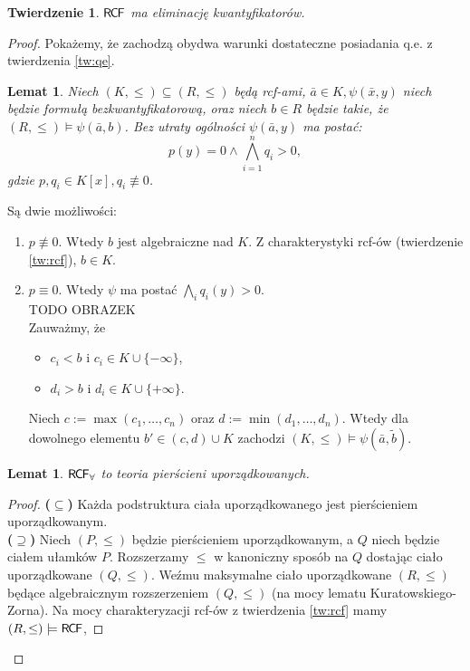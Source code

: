 \documentclass{article}
\theoremstyle{plain}
\newtheorem{tw}[thm]{Twierdzenie}
\newtheorem{lem}[thm]{Lemat}
\theoremstyle{definition}
\theoremstyle{remark}
\newcommand{\RCF}{\mathsf{R \mkern-1.7mu C \mkern-1.4mu F}}
\begin{document}
\begin{tw}
	 $ \RCF$ ma eliminację kwantyfikatorów.
\end{tw}
\begin{proof}
	Pokażemy, że zachodzą obydwa warunki dostateczne posiadania q.e. z twierdzenia \ref{tw:qe}.
	\begin{lem} %
		 Niech $ (K, \leq) \subseteq (R, \leq)$ będą rcf-ami,
	        $ \bar{a} \in K, \psi(\bar{x}, y)$ niech będzie formułą bezkwantyfikatorową,
		oraz niech $ b \in R$ będzie takie, że $(R, \leq) \models  \psi(\bar{a}, b)$.
		Bez utraty ogólności $ \psi(\bar{a}, y)$ ma postać:
		\[
			p(y) = 0 \wedge  \bigwedge_{ i = 1 }^n q_i > 0,
		\]
		gdzie $ p, q_i \in K[x], q_i \not \equiv 0$.
	\end{lem}
	Są dwie możliwości:
	\begin{enumerate}
		\item $ p \not \equiv 0$.
			Wtedy $ b$ jest algebraiczne nad $ K$.
			Z charakterystyki rcf-ów (twierdzenie \ref{tw:rcf}), $ b \in K$.
		\item $ p \equiv 0$.
			Wtedy $ \psi$ ma postać $ \bigwedge_{ i } q_i(y) > 0$.
			\\TODO OBRAZEK\\
			Zauważmy, że
			\begin{itemize}
				\item $ c_i < b$ i $ c_i \in K \cup \{-\infty\}$,
				\item $ d_i > b$ i $ d_i \in K \cup \{+\infty\}$.
			\end{itemize}
			Niech $ c := \max (c_1, \ldots, c_n)$ oraz $ d := \min (d_1, \ldots, d_n)$.
			Wtedy dla dowolnego elementu $ b' \in (c,d) \cup K $ zachodzi $ (K, \leq) \models \psi(\bar{a},\tilde{b})$.
	\end{enumerate}
	\begin{lem}
		 $\RCF_{\forall}$ to teoria pierścieni uporządkowanych.
	\end{lem}
	\begin{proof}
		 \textbf{($ \subseteq$)} Każda podstruktura ciała uporządkowanego jest pierścieniem uporządkowanym.
		 \\\textbf{($ \supseteq$)} Niech $ (P, \leq)$ będzie pierścieniem uporządkowanym, a $Q$ niech będzie ciałem ułamków $P$.
		 Rozszerzamy $\leq$ w kanoniczny sposób na $Q$ dostając ciało uporządkowane $ (Q, \leq)$.
		 Weźmu maksymalne ciało uporządkowane $(R, \leq)$ będące algebraicznym rozszerzeniem $ (Q, \leq)$
		 (na mocy lematu Kuratowskiego-Zorna).
		 Na mocy charakteryzacji rcf-ów z twierdzenia \ref{tw:rcf} mamy $(R, \leq) \models \RCF$,

\end{proof}
\end{proof}
\end{document}
